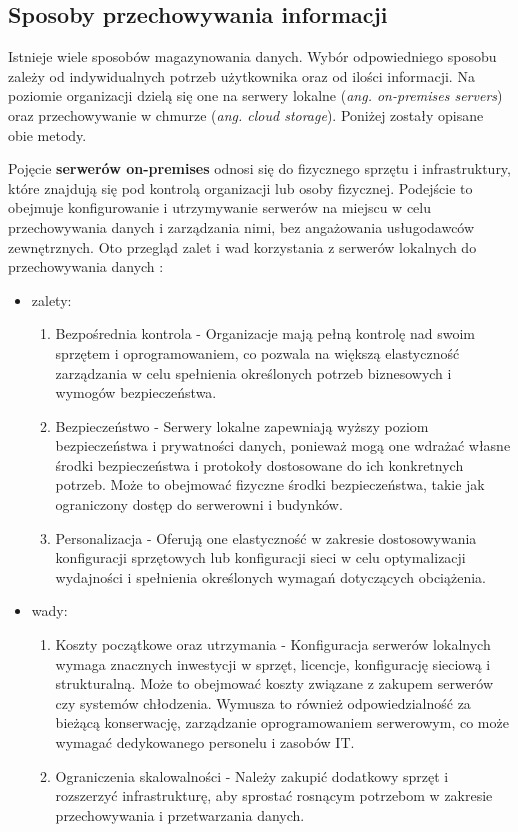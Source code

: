\documentclass[12pt,a4paper,twoside]{article}
\begin{document}
\subsection{Sposoby przechowywania informacji}
Istnieje wiele sposobów magazynowania danych. Wybór odpowiedniego sposobu zależy od indywidualnych potrzeb użytkownika oraz od ilości informacji. Na poziomie organizacji dzielą się one na serwery lokalne (\textit{ang. on-premises servers}) oraz przechowywanie w chmurze (\textit{ang. cloud storage}). Poniżej zostały opisane obie metody.\par
Pojęcie \textbf{serwerów on-premises} odnosi się do fizycznego sprzętu i infrastruktury, które znajdują się pod kontrolą organizacji lub osoby fizycznej. Podejście to obejmuje konfigurowanie i utrzymywanie serwerów na miejscu w celu przechowywania danych i zarządzania nimi, bez angażowania usługodawców zewnętrznych. Oto przegląd zalet i wad korzystania z serwerów lokalnych do przechowywania danych \cite{F2023}:
\begin{itemize}
	\item zalety:
		\begin{enumerate}
			\item Bezpośrednia kontrola - Organizacje mają pełną kontrolę nad swoim sprzętem i oprogramowaniem, co pozwala na większą elastyczność zarządzania w celu spełnienia określonych potrzeb biznesowych i wymogów bezpieczeństwa.
			\item Bezpieczeństwo - Serwery lokalne zapewniają  wyższy poziom bezpieczeństwa i prywatności danych, ponieważ mogą one wdrażać własne środki bezpieczeństwa i protokoły dostosowane do ich konkretnych potrzeb. Może to obejmować fizyczne środki bezpieczeństwa, takie jak ograniczony dostęp do serwerowni i budynków.
			\item Personalizacja - Oferują one elastyczność w zakresie dostosowywania konfiguracji sprzętowych lub konfiguracji sieci w celu optymalizacji wydajności i spełnienia określonych wymagań dotyczących obciążenia.\\
		\end{enumerate}
	\item wady:
		\begin{enumerate}
			\item Koszty początkowe oraz utrzymania - Konfiguracja serwerów lokalnych wymaga znacznych inwestycji w sprzęt, licencje, konfigurację sieciową i strukturalną. Może to obejmować koszty związane z zakupem serwerów czy systemów chłodzenia. Wymusza to również odpowiedzialność za bieżącą konserwację, zarządzanie oprogramowaniem serwerowym, co może wymagać dedykowanego personelu i zasobów IT.
			\item Ograniczenia skalowalności - Należy zakupić dodatkowy sprzęt i rozszerzyć infrastrukturę, aby sprostać rosnącym potrzebom w zakresie przechowywania i przetwarzania danych. 
		\end{enumerate}
\end{itemize}\par
\end{document}
